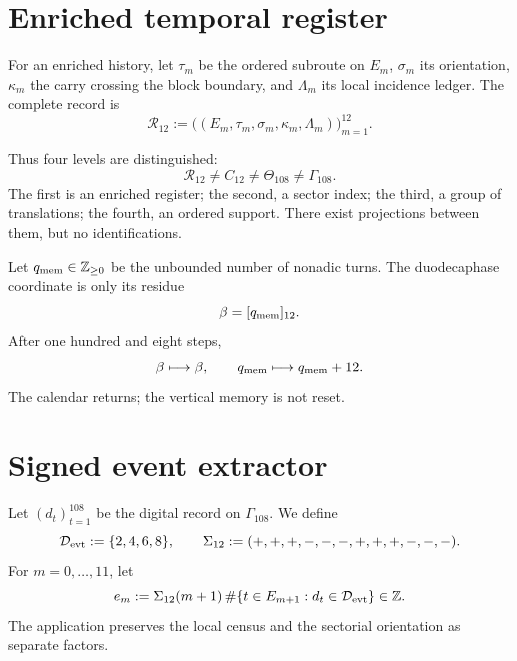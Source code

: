 \section{Enriched temporal register}

\begin{definition}
\label{def:u006d-registro-dodecafasico}
For an enriched history, let \(\tau_m\) be the ordered subroute on
\(E_m\), \(\sigma_m\) its orientation, \(\kappa_m\) the carry crossing the
block boundary, and \(\Lambda_m\) its local incidence ledger. The
complete record is
\begin{equation}
 \mathcal R_{12}:=
 \bigl(
 (E_m,\tau_m,\sigma_m,\kappa_m,\Lambda_m)
 \bigr)_{m=1}^{12}.
 \label{eq:u006d-registro-r12}
\end{equation}
\end{definition}

Thus four levels are distinguished:
\begin{equation}
 \boxed{
 \mathcal R_{12}
 \neq C_{12}
 \neq\Theta_{108}
 \neq\Gamma_{108}.}
 \label{eq:u006d-cuatro-objetos}
\end{equation}
The first is an enriched register; the second, a sector index; the
third, a group of translations; the fourth, an ordered support. There exist
projections between them, but no identifications.

Let \(q_{\rm mem}\in\mathbb Z_{\geq0}\) be the unbounded number of nonadic
turns. The duodecaphase coordinate is only its residue
\[
 \beta=[q_{\rm mem}]_{12}.
\]
After one hundred and eight steps,
\[
 \beta\longmapsto\beta,
 \qquad
 q_{\rm mem}\longmapsto q_{\rm mem}+12.
\]
The calendar returns; the vertical memory is not reset.

\section{Signed event extractor}

Let \((d_t)_{t=1}^{108}\) be the digital record on
\(\Gamma_{108}\). We define
\begin{equation}
 \mathcal D_{\rm evt}:=\{2,4,6,8\},
 \qquad
 \Sigma_{12}:=(+,+,+,-,-,-,+,+,+,-,-,-).
 \label{eq:u006d-datos-eventos}
\end{equation}
For \(m=0,\ldots,11\), let
\begin{equation}
 e_m:=
 \Sigma_{12}(m+1)\,
 \#\{t\in E_{m+1}:d_t\in\mathcal D_{\rm evt}\}
 \in\mathbb Z.
 \label{eq:u006d-eventos-firmados}
\end{equation}
The application preserves the local census and the sectorial orientation as separate factors.

